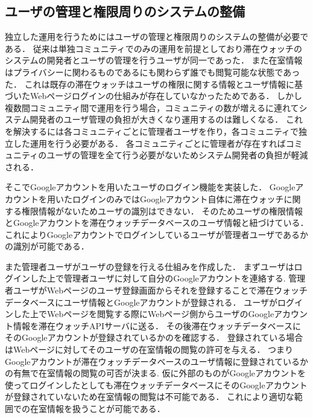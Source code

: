 
\subsection{ユーザの管理と権限周りのシステムの整備}
独立した運用を行うためにはユーザの管理と権限周りのシステムの整備が必要である．
従来は単独コミュニティでのみの運用を前提としており滞在ウォッチのシステムの開発者とユーザの管理を行うユーザが同一であった．
また在室情報はプライバシーに関わるものであるにも関わらず誰でも閲覧可能な状態であった．
これは既存の滞在ウォッチはユーザの権限に関する情報とユーザ情報に基づいたWebページログインの仕組みが存在していなかったためである．
しかし複数間コミュニティ間で運用を行う場合，コミュニティの数が増えるに連れてシステム開発者のユーザ管理の負担が大きくなり運用するのは難しくなる．
これを解決するには各コミュニティごとに管理者ユーザを作り，各コミュニティで独立した運用を行う必要がある．
各コミュニティごとに管理者が存在すればコミュニティのユーザの管理を全て行う必要がないためシステム開発者の負担が軽減される．

そこでGoogleアカウントを用いたユーザのログイン機能を実装した．
Googleアカウントを用いたログインのみではGoogleアカウント自体に滞在ウォッチに関する権限情報がないためユーザの識別はできない．
そのためユーザの権限情報とGoogleアカウントを滞在ウォッチデータベースのユーザ情報と紐づけている．
これによりGoogleアカウントでログインしているユーザが管理者ユーザであるかの識別が可能である．



また管理者ユーザがユーザの登録を行える仕組みを作成した．
まずユーザはログインした上で管理者ユーザに対して自分のGoogleアカウントを連絡する.
管理者ユーザがWebページのユーザ登録画面からそれを登録することで滞在ウォッチデータベースにユーザ情報とGoogleアカウントが登録される．
ユーザがログインした上でWebページを閲覧する際にWebページ側からユーザのGoogleアカウント情報を滞在ウォッチAPIサーバに送る．
その後滞在ウォッチデータベースにそのGoogleアカウントが登録されているかのを確認する．
登録されている場合はWebページに対してそのユーザの在室情報の閲覧の許可を与える．
つまりGoogleアカウントが滞在ウォッチデータベースのユーザ情報に登録されているかの有無で在室情報の閲覧の可否が決まる.
仮に外部のものがGoogleアカウントを使ってログインしたとしても滞在ウォッチデータベースにそのGoogleアカウントが登録されていないため在室情報の閲覧は不可能である．
これにより適切な範囲での在室情報を扱うことが可能である．